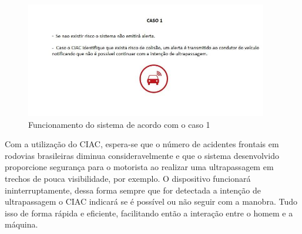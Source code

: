 \begin{figure}[h]
  \centering
  \includegraphics[width=400px, scale=1]{figuras/funcionamentociac1}
  \caption{Funcionamento do sistema de acordo com o caso 1}
\label{fig:funcionamentociac1}
\end{figure}

Com a utilização do CIAC, espera-se que o número de acidentes frontais em rodovias
brasileiras diminua consideravelmente e que o sistema desenvolvido proporcione
segurança para o motorista ao realizar uma ultrapassagem em trechos de pouca
visibilidade, por exemplo. O dispositivo funcionará ininterruptamente, dessa
forma sempre que for detectada a intenção de ultrapassagem o CIAC indicará se é
possível ou não seguir com a manobra. Tudo isso de forma rápida e eficiente,
facilitando então a interação entre o homem e a máquina.
